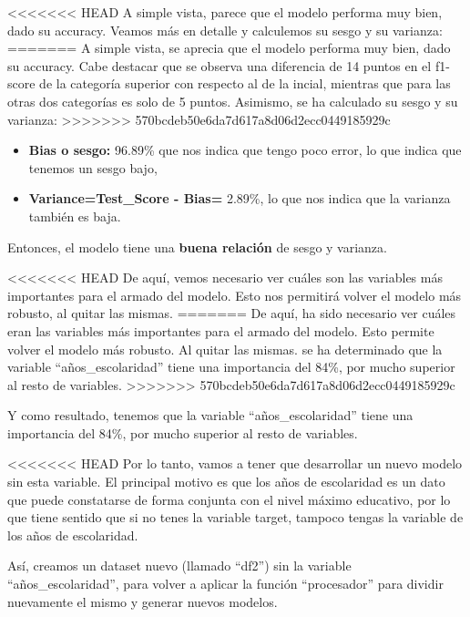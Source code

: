 \documentclass[a4paper]{article}
\begin{document}
<<<<<<< HEAD
            A simple vista, parece que el modelo performa muy bien, dado su accuracy. Veamos más en detalle y calculemos su sesgo y su varianza:
=======
            A simple vista, se aprecia que el modelo performa muy bien, dado su accuracy. Cabe destacar que se observa una diferencia de 14 puntos en el f1-score de la categoría superior con respecto al de la incial, mientras que para las otras dos categorías es solo de 5 puntos. Asimismo, se ha calculado su sesgo y su varianza:
>>>>>>> 570bcdeb50e6da7d617a8d06d2ecc0449185929c
            \begin{itemize}
                \item \textbf{Bias o sesgo:} 96.89\% que nos indica que tengo poco error, lo que indica que tenemos un sesgo bajo,
                \item \textbf{Variance=Test\_Score - Bias=} 2.89\%, lo que nos indica que la varianza también es baja.
            \end{itemize}

            Entonces, el modelo tiene una \textbf{buena relación} de sesgo y varianza.

<<<<<<< HEAD
            De aquí, vemos necesario ver cuáles son las variables más importantes para el armado del modelo. Esto nos permitirá volver el modelo más robusto, al quitar las mismas. 
=======
            De aquí, ha sido necesario ver cuáles eran las variables más importantes para el armado del modelo. Esto permite volver el modelo más robusto. Al quitar las mismas. se ha determinado que la variable ``años\_escolaridad'' tiene una importancia del 84\%, por mucho superior al resto de variables.
>>>>>>> 570bcdeb50e6da7d617a8d06d2ecc0449185929c

            Y como resultado, tenemos que la variable ``años\_escolaridad'' tiene una importancia del 84\%, por mucho superior al resto de variables.


<<<<<<< HEAD
            Por lo tanto, vamos a tener que desarrollar un nuevo modelo sin esta variable. El principal motivo es que los años de escolaridad es un dato que puede constatarse de forma conjunta con el nivel máximo educativo, por lo que tiene sentido que si no tenes la variable target, tampoco tengas la variable de los años de escolaridad.

            Así, creamos un dataset nuevo (llamado ``df2'') sin la variable ``años\_escolaridad'', para volver a aplicar la función ``procesador'' para dividir nuevamente el mismo y generar nuevos modelos.
\end{document}
